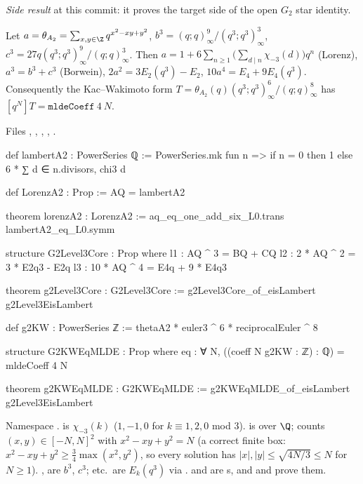 \noindent\emph{Side result} at this commit: it proves the target side of the open $G_2$ star identity.
\begin{theorem}\label{l25:thm:g2target}
Let $a=\theta_{A_2}=\sum_{x,y\in\Z}q^{x^2-xy+y^2}$, $b^3=(q;q)^9_\infty/(q^3;q^3)^3_\infty$, $c^3=27q(q^3;q^3)^9_\infty/(q;q)^3_\infty$.
Then $a=1+6\sum_{n\ge1}\big(\sum_{d\mid n}\chi_{-3}(d)\big)q^n$ (Lorenz), $a^3=b^3+c^3$ (Borwein), $2a^2=3E_2(q^3)-E_2$,
$10a^4=E_4+9E_4(q^3)$. Consequently the Kac--Wakimoto form $T=\theta_{A_2}(q)(q^3;q^3)^6_\infty/(q;q)^8_\infty$ has
$[q^N]T=\mathtt{mldeCoeff}\ 4\ N$.
\end{theorem}
\noindent Files ,
, , ,
.
\begin{leancode}
def lambertA2 : PowerSeries ℚ :=
  PowerSeries.mk fun n => if n = 0 then 1 else 6 * ∑ d ∈ n.divisors, chi3 d

def LorenzA2 : Prop := AQ = lambertA2

theorem lorenzA2 : LorenzA2 := aq_eq_one_add_six_L0.trans lambertA2_eq_L0.symm

structure G2Level3Core : Prop where
  l1 : AQ ^ 3 = BQ + CQ
  l2 : 2 * AQ ^ 2 = 3 * E2q3 - E2q
  l3 : 10 * AQ ^ 4 = E4q + 9 * E4q3

theorem g2Level3Core : G2Level3Core := g2Level3Core_of_eisLambert g2Level3EisLambert

def g2KW : PowerSeries ℤ := thetaA2 * euler3 ^ 6 * reciprocalEuler ^ 8

structure G2KWEqMLDE : Prop where
  eq : ∀ N, ((coeff N g2KW : ℤ) : ℚ) = mldeCoeff 4 N

theorem g2KWEqMLDE : G2KWEqMLDE := g2KWEqMLDE_of_eisLambert g2Level3EisLambert
\end{leancode}
\begin{dictionary}
Namespace .  is $\chi_{-3}(k)$ ($1,-1,0$ for $k\equiv1,2,0$ mod 3).  is
 over $\Q$;  counts $(x,y)\in[-N,N]^2$ with $x^2-xy+y^2=N$ (a correct finite box: $x^2-xy+y^2\ge\frac34\max(x^2,y^2)$, so every solution has
$|x|,|y|\le\sqrt{4N/3}\le N$ for $N\ge1$). ,
 are $b^3$, $c^3$;  etc.\ are $E_k(q^3)$ via .  and
 are s, and  and  prove them.
\end{dictionary}
